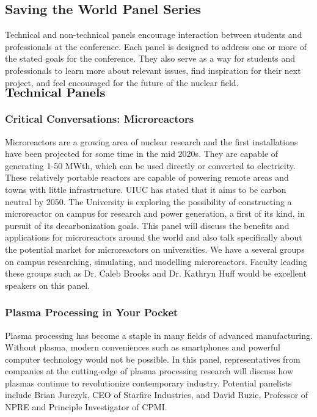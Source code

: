 \subsection{Saving the World Panel Series}
Technical and non-technical panels encourage interaction between students and professionals at the conference. Each panel is designed to address one or more of the stated goals for the conference. They also serve as a way for students and professionals to learn more about relevant issues, find inspiration for their next project, and feel encouraged for the future of the nuclear field.\\
 
$\Large\textbf{Technical Panels}$

\subsubsection{Critical Conversations: Microreactors}
Microreactors are a growing area of nuclear research and the first installations have been projected for some time in the mid 2020s. They are capable of generating 1-50 MWth, which can be used directly or converted to electricity. These relatively portable reactors are capable of powering remote areas and towns with little infrastructure. UIUC has stated that it aims to be carbon neutral by 2050. The University is exploring the possibility of constructing a microreactor on campus for research and power generation, a first of its kind, in pursuit of its decarbonization goals. This panel will discuss the benefits and applications for microreactors around the world and also talk specifically about the potential market for microreactors on universities. We have a several groups on campus researching, simulating, and modelling microreactors. Faculty leading these groups such as Dr. Caleb Brooks and Dr. Kathryn Huff would be excellent speakers on this panel.


\subsubsection{Plasma Processing in Your Pocket}
Plasma processing has become a staple in many fields of advanced manufacturing. Without plasma, modern conveniences such as smartphones and powerful computer technology would not be possible. In this panel, representatives from companies at the cutting-edge of plasma processing research will discuss how plasmas continue to revolutionize contemporary industry. Potential panelists include Brian Jurczyk, CEO of Starfire Industries, and David Ruzic, Professor of NPRE and Principle Investigator of CPMI.

